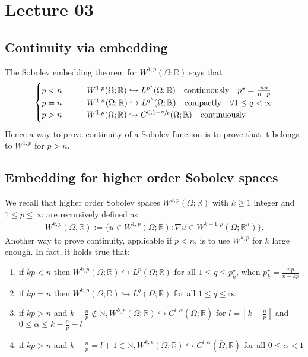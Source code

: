 \chapter{Lecture 03}

\section{Continuity via embedding}

The Sobolev embedding theorem for \(W^{1,p}(\Omega; \mathbb{R})\) says that
\begin{align}
	\begin{cases}
		p<n \qquad   & W^{1,p}(\Omega; \mathbb{R}) \hookrightarrow L^{p^{\star}}(\Omega;\mathbb{R}) \quad \text{continuously} \quad p^{\star}=\frac{np}{n-p} \\
		p=n \qquad   & W^{1,n}(\Omega; \mathbb{R}) \hookrightarrow L^{q^{\star}}(\Omega;\mathbb{R}) \quad \text{compactly} \quad \forall 1 \leq q < \infty   \\
		p > n \qquad & W^{1,p}(\Omega; \mathbb{R}) \hookrightarrow C^{0, 1-\sfrac{n}{p}}(\Omega;\mathbb{R}) \quad \text{continuously}
	\end{cases}
\end{align}
Hence a way to prove continuity of a Sobolev function is to prove that it belongs to \(W^{1,p}\) for \(p>n\).

\section{Embedding for higher order Sobolev spaces}

We recall that higher order Sobolev spaces \(W^{k,p}(\Omega; \mathbb{R})\) with \(k \geq 1\) integer and \(1 \leq p \leq \infty \) are recursively defined as
\begin{gather}
	W^{k,p}(\Omega, \mathbb{R}):= \{ u \in W^{1,p}(\Omega; \mathbb{R}): \nabla u \in W^{k-1,p}(\Omega; \mathbb{R}^{n})\}.
\end{gather}
Another way to prove continuity, applicable if \(p < n\), is to use \(W^{k,p}\) for \(k\) large enough. In fact, it holds true that:
\begin{enumerate}[label= (\arabic*)]
	\item if \(kp<n\) then \(W^{k,p}(\Omega; \mathbb{R})\hookrightarrow L^{p}(\Omega;\mathbb{R})\) for all \(1 \leq q \leq p_{k}^{\star}\), when \(p_{k}^{\star}=\frac{np}{n-kp}\)
	\item if \(kp=n\) then \(W^{k,p}(\Omega; \mathbb{R}) \hookrightarrow L^{q}(\Omega; \mathbb{R}) \) for all \( 1 \leq q\leq \infty \)
	\item if \( kp > n \) and \( k-\frac{n}{p}\notin \mathbb{N}, W^{k,p}(\Omega;\mathbb{R}) \hookrightarrow C^{l,\alpha}(\overline{\Omega; \mathbb{R}})\) for \( l= \left\lfloor k-\frac{n}{p} \right\rfloor  \) and \( 0 \leq \alpha\leq k-\frac{n}{p}-l \)
	\item if \( kp> n \) and \( k-\frac{n}{p}=l+1 \in \mathbb{N}, W^{k,p}(\Omega; \mathbb{R}) \hookrightarrow C^{l,\alpha} (\overline{\Omega}; \mathbb{R})\) for all \( 0 \leq \alpha < 1 \)
\end{enumerate}

